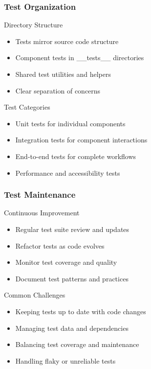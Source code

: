 \documentclass{beamer}
\begin{document}
\begin{frame}
    \frametitle{Test Organization}
    \begin{block}{Directory Structure}
        \begin{itemize}
            \item Tests mirror source code structure
            \item Component tests in \_\_tests\_\_ directories
            \item Shared test utilities and helpers
            \item Clear separation of concerns
        \end{itemize}
    \end{block}
    
    \begin{alertblock}{Test Categories}
        \begin{itemize}
            \item Unit tests for individual components
            \item Integration tests for component interactions
            \item End-to-end tests for complete workflows
            \item Performance and accessibility tests
        \end{itemize}
    \end{alertblock}
\end{frame}

\begin{frame}
    \frametitle{Test Maintenance}
    \begin{block}{Continuous Improvement}
        \begin{itemize}
            \item Regular test suite review and updates
            \item Refactor tests as code evolves
            \item Monitor test coverage and quality
            \item Document test patterns and practices
        \end{itemize}
    \end{block}
    
    \begin{alertblock}{Common Challenges}
        \begin{itemize}
            \item Keeping tests up to date with code changes
            \item Managing test data and dependencies
            \item Balancing test coverage and maintenance
            \item Handling flaky or unreliable tests
        \end{itemize}
    \end{alertblock}
\end{frame}
\end{document}
